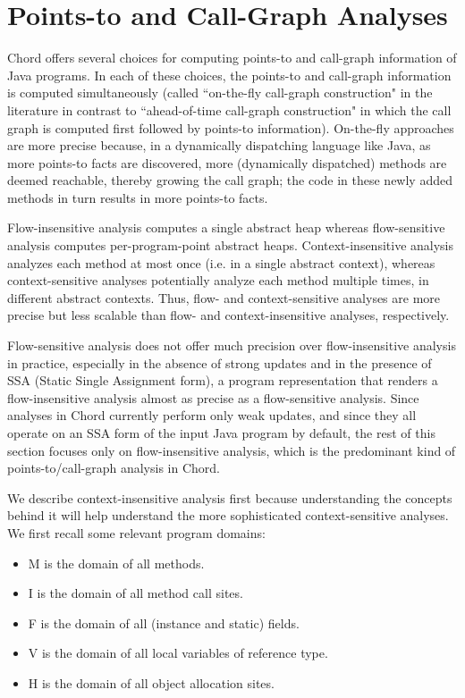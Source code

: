 \section{Points-to and Call-Graph Analyses}

Chord offers several choices for computing points-to and call-graph information
of Java programs.  In each of these choices, the points-to and call-graph
information is computed simultaneously (called ``on-the-fly call-graph
construction" in the literature in contrast to ``ahead-of-time call-graph
construction" in which the call graph is computed first followed by points-to
information).  On-the-fly approaches are more precise because, in a dynamically
dispatching language like Java, as more points-to facts are discovered, more
(dynamically dispatched) methods are deemed reachable, thereby growing the call
graph; the code in these newly added methods in turn results in more points-to
facts.

Flow-insensitive analysis computes a single abstract heap whereas flow-sensitive
analysis computes per-program-point abstract heaps.  Context-insensitive
analysis analyzes each method at most once (i.e. in a single abstract context),
whereas context-sensitive analyses potentially analyze each method multiple
times, in different abstract contexts.  Thus, flow- and context-sensitive
analyses are more precise but less scalable than flow- and context-insensitive
analyses, respectively.

Flow-sensitive analysis does not offer much precision over flow-insensitive
analysis in practice, especially in the absence of strong updates and in the
presence of SSA (Static Single Assignment form), a program representation that
renders a flow-insensitive analysis almost as precise as a flow-sensitive
analysis.  Since analyses in Chord currently perform only weak updates, and
since they all operate on an SSA form of the input Java program by default, the
rest of this section focuses only on flow-insensitive analysis, which is the
predominant kind of points-to/call-graph analysis in Chord.

We describe context-insensitive analysis first because understanding the
concepts behind it will help understand the more sophisticated context-sensitive
analyses.  We first recall some relevant program domains:

\texonly{\newpage}

\begin{itemize}
\item M is the domain of all methods.
\item I is the domain of all method call sites.
\item F is the domain of all (instance and static) fields.
\item V is the domain of all local variables of reference type.
\item H is the domain of all object allocation sites.
\end{itemize}

